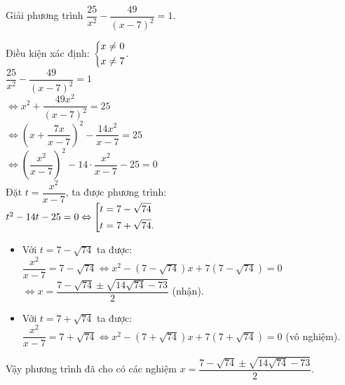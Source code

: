 \begin{bt}%
	Giải phương trình $\dfrac{25}{x^2} - \dfrac{49}{(x-7)^2} = 1$.
	\loigiai
	{
		Điều kiện xác định: $\left\{\begin{aligned}& x \neq 0 \\& x \neq 7\end{aligned}\right.$.\\
		\hspace*{0.6cm} $\dfrac{25}{x^2} - \dfrac{49}{(x-7)^2} = 1$\\
		$\Leftrightarrow x^2 + \dfrac{49x^2}{(x-7)^2} = 25$\\
		$\Leftrightarrow \left( x + \dfrac{7x}{x-7} \right)^2 - \dfrac{14x^2}{x-7} = 25$\\
		$\Leftrightarrow \left( \dfrac{x^2}{x-7} \right)^2 - 14 \cdot \dfrac{x^2}{x-7} - 25 = 0$\\
		Đặt $t = \dfrac{x^2}{x-7}$, ta được phương trình:\\
		\hspace*{0.6cm}$t^2 - 14t - 25 = 0 \Leftrightarrow \left[\begin{aligned}& t = 7 - \sqrt{74} \\& t = 7 + \sqrt{74}.\end{aligned}\right.$
		\begin{itemize}
			\item Với $t = 7 - \sqrt{74}$ ta được:\\
			$\dfrac{x^2}{x-7} = 7 - \sqrt{74} \Leftrightarrow x^2 - \left(7 - \sqrt{74} \right)x + 7\left( 7 - \sqrt{74} \right) = 0$\\
			$\Leftrightarrow x = \dfrac{7 - \sqrt{74} \pm \sqrt{14\sqrt{74} - 73}}{2}$ (nhận).
			\item Với $t = 7 + \sqrt{74}$ ta được:\\
			$\dfrac{x^2}{x-7} = 7 + \sqrt{74} \Leftrightarrow x^2 - \left(7 + \sqrt{74}\right)x + 7\left(7+\sqrt{74}\right) = 0$ (vô nghiệm).
		\end{itemize}
		Vậy phương trình đã cho có các nghiệm $x = \dfrac{7 - \sqrt{74} \pm \sqrt{14\sqrt{74} - 73}}{2}$.
	}
\end{bt}



